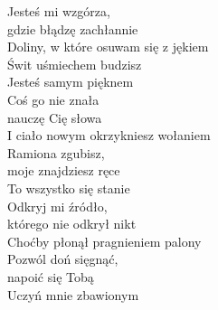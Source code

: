 \begin{text}
    Jesteś mi wzgórza,\\
    gdzie błądzę zachłannie\\
    Doliny, w które osuwam się z jękiem\\
    Świt uśmiechem budzisz\\
    Jesteś samym pięknem\\
    Coś go nie znała\\
    nauczę Cię słowa\\
    I ciało nowym okrzykniesz wołaniem\\
    Ramiona zgubisz,\\
    moje znajdziesz ręce\\
    To wszystko się stanie\\
    Odkryj mi źródło,\\
    którego nie odkrył nikt\\
    Choćby płonął pragnieniem palony\\
    Pozwól doń sięgnąć,\\
    napoić się Tobą\\
    Uczyń mnie zbawionym
\end{text}
\begin{chord}

\end{chord}
